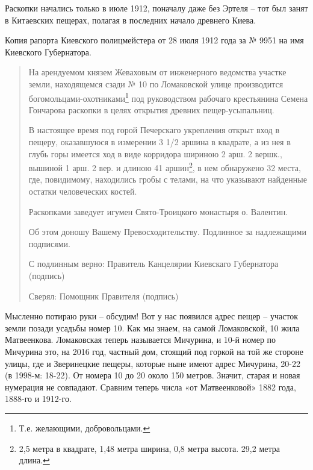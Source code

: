 Раскопки начались только в июле 1912, поначалу даже без Эртеля – тот был занят в Китаевских пещерах, полагая в последних начало древнего Киева.

Копия рапорта Киевского полицмейстера от 28 июля 1912 года за № 9951 на имя Киевского Губернатора.

\begin{quotation}
На арендуемом князем Жеваховым от инженерного ведомства участке земли, находящемся сзади № 10 по Ломаковской улице производится богомольцами-охотниками\footnote{Т.е. желающими, добровольцами.} под руководством рабочаго крестьянина Семена Гончарова раскопки в целях открытия древних пещер-усыпальниц. 


В настоящее время под горой Печерскаго укрепления открыт вход в пещеру, оказавшуюся в измерении 3 1/2 аршина в квадрате, а из нея в глубь горы имеется ход в виде корридора шириною 2 арш. 2 вершк., вышиной 1 арш. 2 вер. и длиною 41 аршин\footnote{2,5 метра в квадрате, 1,48 метра ширина, 0,8 метра высота. 29,2 метра длина.}, в нем обнаружено 32 места, где, повидимому, находились гробы с телами, на что указывают найденные остатки человеческих костей.

Раскопками заведует игумен Свято-Троицко\-го монастыря о. Валентин. 

Об этом доношу Вашему Превосходительству. Подлинное за надлежащими подписями.

С подлинным верно: Правитель Канцелярии Киевскаго Губернатора (подпись)

Сверял: Помощник Правителя (подпись)\end{quotation}

Мысленно потираю руки – обсудим! Вот у нас появился адрес пещер – участок земли позади усадьбы номер 10. Как мы знаем, на самой Ломаковской, 10 жила Матвеенкова. Ломаковская теперь называется Мичурина, и 10-й номер по Мичурина это, на 2016 год, частный дом, стоящий под горкой на той же стороне улицы, где и Зверинецкие пещеры, которые ныне имеют адрес Мичурина, 20-22 (в 1998-м: 18-22). От номера 10 до 20 около 150 метров. Значит, старая и новая нумерация не совпадают. Сравним теперь числа «от Матвеенковой» 1882 года, 1888-го и 1912-го.

